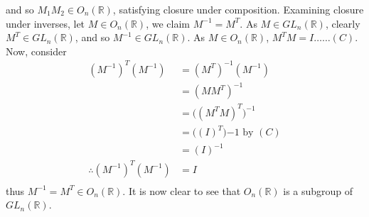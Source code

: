 \documentclass[a4paper,11pt]{article}
\newcommand{\ds}{\displaystyle}
\begin{document}
{{\begin{enumerate}[leftmargin=*]
		and so $\ds{M_1M_2 \in O_n(\mathbb{R})}$, satisfying closure under composition. Examining closure under inverses, let $\ds{M \in O_n(\mathbb{R})}$, we claim $\ds{M^{-1} = M^T}$. As $\ds{M \in GL_n(\mathbb{R})}$, clearly $\ds{M^T \in GL_n(\mathbb{R})}$, and so $\ds{M^{-1} \in GL_n(\mathbb{R})}$. As $\ds{M \in O_n(\mathbb{R})}$, $\ds{M^TM = I \dots\dots (C)}$. Now, consider
		\begin{align*}
			(M^{-1})^T(M^{-1}) & = (M^T)^{-1}(M^{-1})\\
							   & = (MM^T)^{-1}\\
							   & = \big((M^TM)^T\big)^{-1}\\
							   & = \big((I)^T\big){-1} \text{ by } (C)\\
							   & = (I)^{-1}\\
			\therefore (M^{-1})^T(M^{-1}) & = I\\
		\end{align*}
		thus $\ds{M^{-1} = M^T \in O_n(\mathbb{R})}$. It is now clear to see that $\ds{O_n(\mathbb{R})}$ is a subgroup of $\ds{GL_n(\mathbb{R})}$.

		\pagebreak


\end{enumerate}}}
\end{document}

